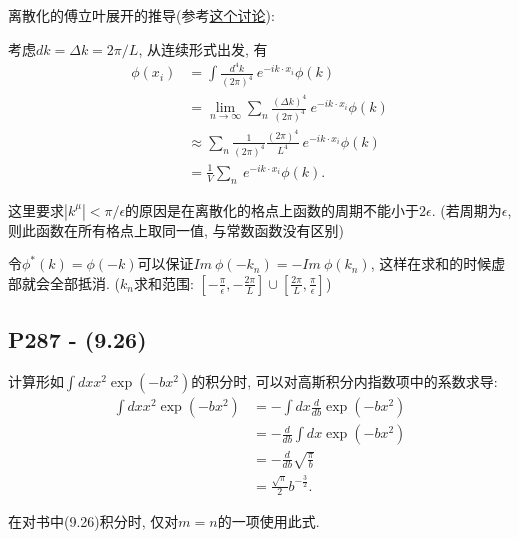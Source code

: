 离散化的傅立叶展开的推导(参考\href{https://physics.stackexchange.com/questions/533991/the-discrete-fourier-series-in-peskin-and-schroeder-page-285}{这个讨论}):

考虑$dk = \Delta k = 2\pi/L$, 从连续形式出发, 有
\begin{equation}
  \begin{aligned}
    \phi(x_i) & = \int \frac{d^4 k}{(2\pi)^4} \ e^{-ik\cdot x_i}\phi(k)                                   \\
              & = \lim_{n\rightarrow\infty}\sum_n \frac{(\Delta k)^4}{(2\pi)^4} \ e^{-ik\cdot x_i}\phi(k) \\
              & \approx \sum_n \frac{1}{(2\pi)^4} \frac{(2\pi)^4}{L^4}\ e^{-ik\cdot x_i}\phi(k)           \\
              & = \frac{1}{V} \sum_n \ e^{-ik\cdot x_i}\phi(k).
  \end{aligned}
\end{equation}

这里要求$|k^{\mu}| < \pi/\epsilon$的原因是在离散化的格点上函数的周期不能小于$2\epsilon$.
(若周期为$\epsilon$, 则此函数在所有格点上取同一值, 与常数函数没有区别)

令$\phi^*(k) = \phi(-k)$可以保证$Im\ \phi(-k_n) = -Im\ \phi(k_n)$, 这样在求和的时候虚部就会全部抵消.
($k_n$求和范围: $[-\frac{\pi}{\epsilon}, -\frac{2\pi}{L}]\cup [\frac{2\pi}{L}, \frac{\pi}{\epsilon}]$)

\subsection{P287 - (9.26)}

计算形如$\int dx x^2 \exp(-bx^2)$的积分时, 可以对高斯积分内指数项中的系数求导:
\begin{equation}
  \begin{aligned}
    \int dx x^2 \exp(-bx^2) & = -\int dx \frac{d}{db}\exp(-bx^2)      \\
                            & = -\frac{d}{db} \int dx \exp(-bx^2)     \\
                            & = -\frac{d}{db} \sqrt{\frac{\pi}{b}}    \\
                            & = \frac{\sqrt{\pi}}{2}b^{-\frac{3}{2}}.
  \end{aligned}
\end{equation}

在对书中(9.26)积分时, 仅对$m=n$的一项使用此式.

